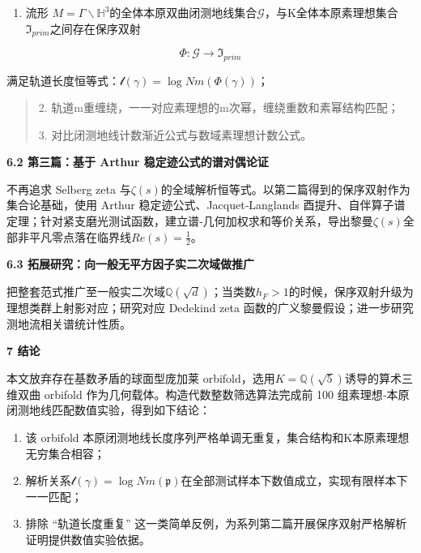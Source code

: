 \documentclass[12pt]{article}
\begin{document}
\begin{enumerate}
\def\labelenumi{\arabic{enumi}.}
\item
  流形
  \(M = \Gamma\backslash\mathbb{H}^{3}\)的全体本原双曲闭测地线集合\(\mathcal{G}\)，与K全体本原素理想集合\(\mathfrak{I}_{prim}\)之间存在保序双射
\end{enumerate}

\[\Phi:\mathcal{G} \rightarrow \mathfrak{I}_{prim}\]

满足轨道长度恒等式：\(\mathcal{l}(\gamma) = \log Nm\left( \Phi(\gamma) \right)\)；

\begin{quote}
2. 轨道m重缠绕，一一对应素理想的m次幂，缠绕重数和素幂结构匹配；

3. 对比闭测地线计数渐近公式与数域素理想计数公式。
\end{quote}

\textbf{6.2 第三篇：基于 Arthur 稳定迹公式的谱对偶论证}

不再追求 Selberg zeta
与\(\zeta(s)\)的全域解析恒等式。以第二篇得到的保序双射作为集合论基础，使用
Arthur 稳定迹公式、Jacquet‑Langlands
酉提升、自伴算子谱定理；针对紧支磨光测试函数，建立谱‑几何加权求和等价关系，导出黎曼\(\zeta(s)\)全部非平凡零点落在临界线\(Re(s) = \frac{1}{2}\)。

\textbf{6.3 拓展研究：向一般无平方因子实二次域做推广}

把整套范式推广至一般实二次域\(\mathbb{Q}\left( \sqrt{d} \right)\)；当类数\(h_{F} > 1\)的时候，保序双射升级为理想类群上射影对应；研究对应
Dedekind zeta 函数的广义黎曼假设；进一步研究测地流相关谱统计性质。

\textbf{7 结论}

本文放弃存在基数矛盾的球面型庞加莱
orbifold，选用\(K = \mathbb{Q}\left( \sqrt{5} \right)\)诱导的算术三维双曲
orbifold 作为几何载体。构造代数整数筛选算法完成前 100
组素理想‑本原闭测地线匹配数值实验，得到如下结论：

\begin{enumerate}
\def\labelenumi{\arabic{enumi}.}
\item
  该 orbifold
  本原闭测地线长度序列严格单调无重复，集合结构和K本原素理想无穷集合相容；
\item
  解析关系\(\mathcal{l}(\gamma) = \log Nm\left( \mathfrak{p} \right)\)在全部测试样本下数值成立，实现有限样本下一一匹配；
\item
  排除 ``轨道长度重复''
  这一类简单反例，为系列第二篇开展保序双射严格解析证明提供数值实验依据。
\end{enumerate}
\end{document}
